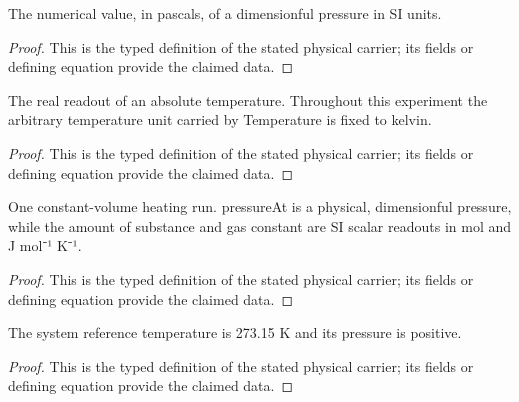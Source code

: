 \begin{definition}
  \label{def:physics:IPhO_2026_4_A_5:aux005}
  The numerical value, in pascals, of a dimensionful pressure in SI units.
\end{definition}
\begin{proof}
  This is the typed definition of the stated physical carrier; its fields or defining equation provide the claimed data.
\end{proof}

\begin{definition}
  \label{def:physics:IPhO_2026_4_A_5:aux006}
  The real readout of an absolute temperature. Throughout this experiment the arbitrary temperature unit carried by Temperature is fixed to kelvin.
\end{definition}
\begin{proof}
  This is the typed definition of the stated physical carrier; its fields or defining equation provide the claimed data.
\end{proof}

\begin{definition}
  \label{def:physics:IPhO_2026_4_A_5:aux007}
  One constant-volume heating run. pressureAt is a physical, dimensionful pressure, while the amount of substance and gas constant are SI scalar readouts in mol and J mol⁻¹ K⁻¹.
\end{definition}
\begin{proof}
  This is the typed definition of the stated physical carrier; its fields or defining equation provide the claimed data.
\end{proof}

\begin{definition}
  \label{def:physics:IPhO_2026_4_A_5:aux008}
  The system reference temperature is 273.15 K and its pressure is positive.
\end{definition}
\begin{proof}
  This is the typed definition of the stated physical carrier; its fields or defining equation provide the claimed data.
\end{proof}

